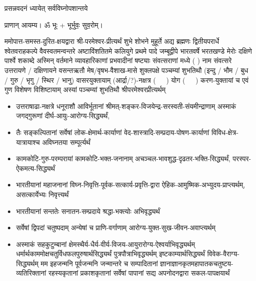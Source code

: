 
\setlength{\parindent}{0pt}




{प्रसन्नवदनं ध्यायेत् सर्वविघ्नोपशान्तये}
 
प्राणान्  आयम्य।  ॐ भूः + भूर्भुवः॒ सुव॒रोम्।


ममोपात्त-समस्त-दुरित-क्षयद्वारा श्री-परमेश्वर-प्रीत्यर्थं शुभे शोभने मुहूर्ते अद्य ब्रह्मणः
द्वितीयपरार्धे श्वेतवराहकल्पे वैवस्वतमन्वन्तरे अष्टाविंशतितमे कलियुगे प्रथमे पादे
जम्बूद्वीपे भारतवर्षे भरतखण्डे मेरोः दक्षिणे पार्श्वे शकाब्दे अस्मिन् वर्तमाने व्यावहारिकाणां प्रभवादीनां षष्ट्याः संवत्सराणां मध्ये (	) नाम संवत्सरे उत्तरायणे / दक्षिणायने 
वसन्तऋतौ  मेष/वृषभ-वैशाख-मासे शुक्लपक्षे पञ्चम्यां शुभतिथौ
(इन्दु / भौम / बुध / गुरु / भृगु / स्थिर / भानु) वासरयुक्तायाम्
(आर्द्रा/?)-नक्षत्र \mbox{(~~~)} योग  \mbox{(~~~)} करण-युक्तायां च एवं गुण विशेषण विशिष्टायाम्
अस्यां पञ्चम्यां  
शुभतिथौ श्रीपरमेश्वरप्रीत्यर्थम्

\begin{itemize}
\item उत्तराषाढा-नक्षत्रे धनूराशौ आविर्भू\-तानां श्रीमत्-शङ्कर-विजयेन्द्र-सरस्वती-संयमीन्द्राणाम् अस्माकं जगद्गुरूणां दीर्घ-आयुः-आरोग्य-सिद्ध्यर्थं,

\item तैः सङ्कल्पितानां सर्वेषां लोक-क्षेमार्थ-कार्याणां वेद-शास्त्रादि-सम्प्रदाय-पोषण-कार्याणां विविध-क्षेत्र-यात्रायाश्च अविघ्नतया सम्पूर्त्यर्थं

\item कामकोटि-गुरु-परम्परायां कामकोटि-भक्त-जनानाम् अचञ्चल-भावशुद्ध-दृढतर-भक्ति-सिद्ध्यर्थं, परस्पर-ऐकमत्य-सिद्ध्यर्थं

\item भारतीयानां महाजनानां विघ्न-निवृत्ति-पूर्वक-सत्कार्य-प्रवृत्ति-द्वारा ऐहिक-आमुष्मिक-अभ्युदय-प्राप्त्यर्थम्, असत्कार्येभ्यः निवृत्त्यर्थं

\item भारतीयानां सन्ततेः सनातन-सम्प्रदाये श्रद्धा-भक्त्योः अभिवृद्ध्यर्थं

\item सर्वेषां द्विपदां चतुष्पदाम् अन्येषां च प्राणि-वर्गाणाम् आरोग्य-युक्त-सुख-जीवन-अवाप्त्यर्थम्

\item अस्माकं सहकुटुम्बानां क्षेमस्थैर्य-धैर्य-वीर्य-विजय-आयुरारोग्य-ऐश्वर्याभिवृद्ध्यर्थम्
 धर्मार्थकाममोक्ष\-चतुर्विधफलपुरुषार्थसिद्ध्यर्थं पुत्रपौत्राभि\-वृद्ध्यर्थम् इष्टकाम्यार्थसिद्ध्यर्थं विवेक-वैराग्य-सिद्ध्यर्थम्
मम इहजन्मनि पूर्वजन्मनि जन्मान्तरे च सम्पादितानां ज्ञानाज्ञानकृतमहा\-पातकचतुष्टय-व्यतिरिक्तानां रहस्यकृतानां प्रकाशकृतानां सर्वेषां पापानां सद्य अपनोदनद्वारा सकल-पापक्षयार्थं 

\end{itemize}

